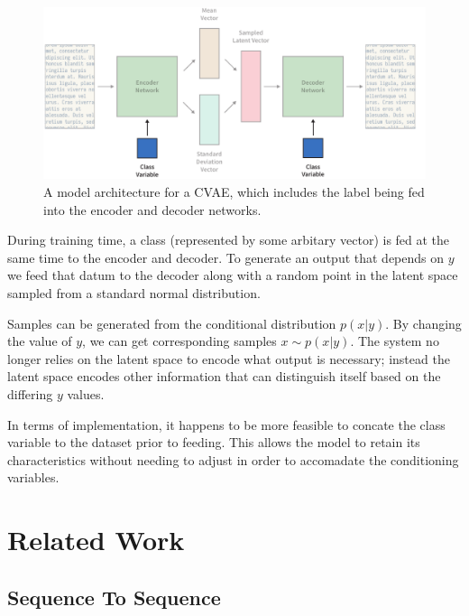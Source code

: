 \documentclass[12pt,twoside]{report}
\begin{document}
\begin{figure}[!ht]
	\centering
	\includegraphics[width=150mm]{diagrams/conditional_variational_autoencoders.pdf}
	\caption{A model architecture for a CVAE, which includes the label being fed into the encoder and decoder networks. \label{cvae_diagram}}
\end{figure}

During training time, a class (represented by some arbitary vector) is fed at the same time to the encoder and decoder. To generate an output that depends on $y$ we feed that datum to the decoder along with a random point in the latent space sampled from a standard normal distribution.

Samples can be generated from the conditional distribution $p(x|y)$. By changing the value of $y$, we can get corresponding samples $x \sim p(x|y)$. The system no longer relies on the latent space to encode what output is necessary; instead the latent space encodes other information that can distinguish itself based on the differing $y$ values.

In terms of implementation, it happens to be more feasible to concate the class variable to the dataset prior to feeding. This allows the model to retain its characteristics without needing to adjust in order to accomadate the conditioning variables.

\section{Related Work}


\subsection{Sequence To Sequence}
\end{document}
